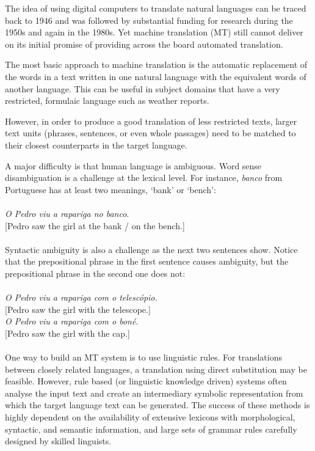 \begin{multicols}{2}
The idea of using digital computers to translate natural languages can be traced back to 1946 and was followed by substantial funding for research during the 1950s and again in the 1980s. 
Yet machine translation (MT) still cannot deliver on its initial promise of providing across the board automated translation.  

The most basic approach to machine translation is the automatic replacement of the words in a text written in one natural language with the equivalent words of another language. This can be useful in subject domains that have a very restricted, formulaic language such as weather reports.

However, in order to produce a good translation of less restricted texts, larger text units (phrases, sentences, or even whole passages) need to be matched to their closest counterparts in the target language.

A major difficulty is that human language is ambiguous. Word sense disambiguation is a challenge at the lexical level. 
For instance, \textit{banco} from Portuguese has at least two meanings, ‘bank’ or ‘bench’:\\
\\
\textit{O Pedro viu a rapariga no banco}.\\
{[}Pedro saw the girl at the bank / on the bench.{]}\\
\\
Syntactic ambiguity is also a challenge as the next two sentences show. Notice that the prepositional phrase in the first sentence causes ambiguity, but the prepositional phrase in the second one does not:\\
\\
\textit{O Pedro viu a rapariga com o telescópio.}\\
{[}Pedro saw the girl with the telescope.{]}\\
\textit{O Pedro viu a rapariga com o boné.}\\
{[}Pedro saw the girl with the cap.{]}\\
\\
One way to build an MT system is to use linguistic rules. For translations between closely related languages, a translation using direct substitution may be feasible. 
However, rule based (or linguistic knowledge driven) systems often analyse the input text and create an intermediary symbolic representation from which the target language text can be generated. The success of these methods is highly dependent on the availability of extensive lexicons with morphological, syntactic, and semantic information, and large sets of grammar rules carefully designed by skilled linguists.


\end{multicols}
